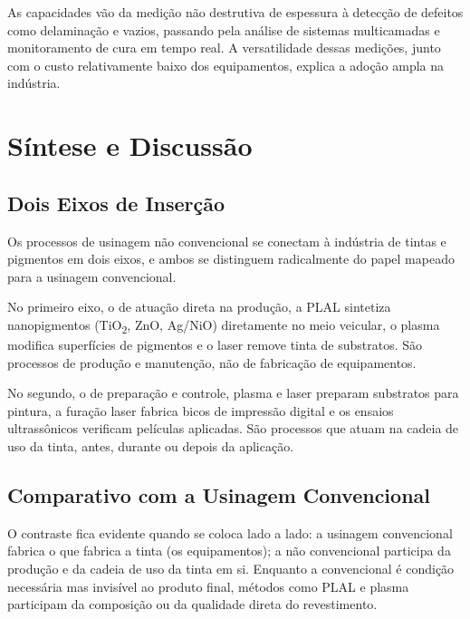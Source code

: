 \documentclass[
  12pt,
  a4paper,
  oneside,
  brazil,
  chapter=TITLE
]{article}
\newcommand{\secbreak}{\clearpage}
\let\oldsection\section
\renewcommand{\section}{\secbreak\oldsection}
\begin{document}
As capacidades vão da medição não destrutiva de espessura à detecção de defeitos como delaminação e vazios, passando pela análise de sistemas multicamadas e monitoramento de cura em tempo real. A versatilidade dessas medições, junto com o custo relativamente baixo dos equipamentos, explica a adoção ampla na indústria.

\section{Síntese e Discussão}\label{sintese-discussao}

\subsection{Dois Eixos de Inserção}\label{dois-eixos}

Os processos de usinagem não convencional se conectam à indústria de tintas e pigmentos em dois eixos, e ambos se distinguem radicalmente do papel mapeado para a usinagem convencional.

No primeiro eixo, o de atuação direta na produção, a PLAL sintetiza nanopigmentos (TiO\textsubscript{2}, ZnO, Ag/NiO) diretamente no meio veicular, o plasma modifica superfícies de pigmentos e o laser remove tinta de substratos. São processos de produção e manutenção, não de fabricação de equipamentos.

No segundo, o de preparação e controle, plasma e laser preparam substratos para pintura, a furação laser fabrica bicos de impressão digital e os ensaios ultrassônicos verificam películas aplicadas. São processos que atuam na cadeia de uso da tinta, antes, durante ou depois da aplicação.

\subsection{Comparativo com a Usinagem Convencional}\label{comparativo}

O contraste fica evidente quando se coloca lado a lado: a usinagem convencional fabrica o que fabrica a tinta (os equipamentos); a não convencional participa da produção e da cadeia de uso da tinta em si. Enquanto a convencional é condição necessária mas invisível ao produto final, métodos como PLAL e plasma participam da composição ou da qualidade direta do revestimento.
\end{document}
